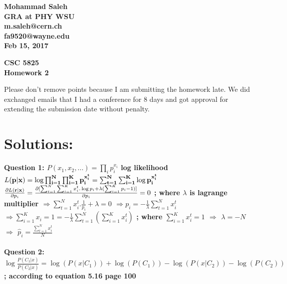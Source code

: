 \documentclass{article}
\begin{document}
\begin{flushright}
\bf{Mohammad Saleh\\
GRA at PHY WSU\\
m.saleh@cern.ch\\ fa9520@wayne.edu\\
Feb 15, 2017}
\end{flushright}

\begin{center}
\bf{CSC 5825 \\
Homework 2 } \\
\end{center}
Please don't remove points because I am submitting the homework late. We did exchanged emails that I had a conference for 8 days and got approval for extending the submission date without penalty.
\section*{Solutions:}
\bf{Question 1:}
\newline
$P(x_{1},x_{2},...)=\prod_{i} p_{i}^{x_{i}}$
\newline
log likelihood $L(\bf{p}|x)=\log\prod_{i=1}^{N}\prod_{i=1}^{K}p_{i}^{x_{i}^{t}}=\sum_{t=1}^{N}\sum_{i=1}^{K}\log p_{i}^{x_{i}^{t}}$
\newline
$\frac{\partial L(\bf{r}|x)}{\partial p_{i}}=\frac{\partial[\sum_{t=1}^{N}\sum_{i=1}^{K}x_{i}^{t}.\log p_{i}+\lambda(\sum_{i=1}^{K}p_{i}-1)]}{\partial p_{i}}=0$ ; where $\lambda$ is lagrange multiplier
\newline
$\Rightarrow \sum_{t=1}^{N}x_{i}^{t}.\frac{1}{p_{i}}+\lambda=0$ \newline
$\Rightarrow$$p_{i}=-\frac{1}{\lambda}\sum_{t=1}^{N}x_{i}^{t}$  \newline
$\Rightarrow\sum_{i=1}^{K}x_{i}=1=-\frac{1}{\lambda}\sum_{t=1}^{N}(\sum_{i=1}^{K}x_{i}^{t})$ ; where $\sum_{i=1}^{K}x_{i}^{t}=1$
\newline
$\Rightarrow$ $\lambda=-N$ \newline
$\Rightarrow$ $\hat{p}_{i}=\frac{\sum_{t=1}^{N}x_{i}^{t}}{N}$
\\\\
\bf{Question 2:}
\newline
$\log\frac{P(C_{1}|x)}{P(C_{2}|x)}=\log(P(x|C_{1}))+\log(P(C_{1}))-\log(P(x|C_{2}))-\log(P(C_{2}))$;   according to equation 5.16 page 100 \newline
\end{document}
